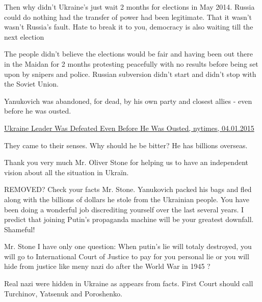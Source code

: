 \begin{itemize}
\begin{itemize}
Then why didn't Ukraine's just wait 2 months for elections in May 2014. Russia
could do nothing had the transfer of power had been legitimate. That it wasn't
wasn't Russia's fault. Hate to break it to you, democracy is also waiting till
the next election


The people didn't believe the elections would be fair and having been out there
in the Maidan for 2 months protesting peacefully with no results before being
set upon by snipers and police. Russian subversion didn't start and didn't stop
with the Soviet Union.


Yanukovich was abandoned, for dead, by his own party and closest allies - even
before he was ousted.

\href{https://www.nytimes.com/2015/01/04/world/europe/ukraine-leader-was-defeated-even-before-he-was-ousted.html}{%
Ukraine Leader Was Defeated Even Before He Was Ousted, nytimes, 04.01.2015%
}

They came to their senses. Why should he be bitter? He has billions overseas.


\end{itemize} %


Thank you very much Mr. Oliver Stone for helping us to have an independent
vision about all the situation in Ukraïn.



REMOVED? Check your facts Mr. Stone. Yanukovich packed his bags and fled along
with the billions of dollars he stole from the Ukrainian people. You have been
doing a wonderful job discrediting yourself over the last several years. I
predict that joining Putin's propaganda machine will be your greatest downfall.
Shameful!



Mr. Stone I have only one question: When putin's lie will totaly destroyed, you
will go to International Court of Justice to pay for you personal lie or you
will hide from justice like meny nazi do after the World War in 1945 ?

\begin{itemize} %
Real nazi were hidden in Ukraine as appears from facts. First Court should call Turchinov, Yatsenuk and Poroshenko.



\end{itemize}
\end{itemize}
